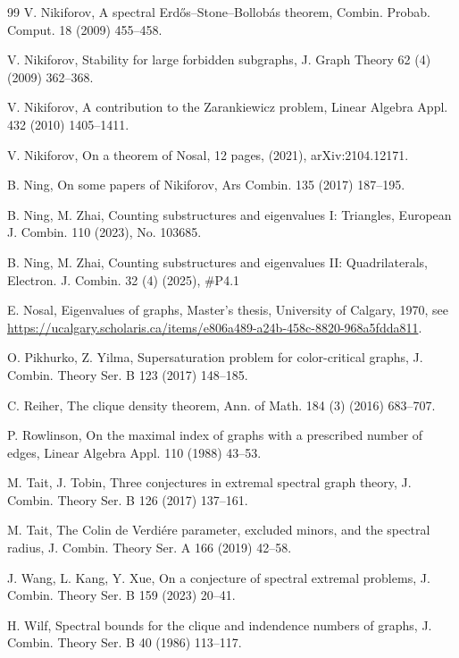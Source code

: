 \documentclass[11pt]{article}
\begin{document}
\begin{thebibliography}{99}
V. Nikiforov, 
A spectral Erd\H{o}s--Stone--Bollob\'{a}s theorem, 
Combin. Probab.  Comput. 18 (2009) 455--458.  

V. Nikiforov, 
Stability for large forbidden subgraphs,  
J. Graph Theory 62 (4) (2009) 362--368.  


V. Nikiforov, A contribution to the Zarankiewicz problem, 
Linear Algebra Appl. 432 (2010) 1405--1411. 

 V. Nikiforov,  On a theorem of Nosal, 12 pages, 
 (2021), arXiv:2104.12171. 

 B. Ning, On some papers of Nikiforov, 
 Ars Combin. 135 (2017) 187--195. 
 
B. Ning, M. Zhai, Counting substructures and eigenvalues I: Triangles, 
European J. Combin.  110 (2023), No. 103685. 

B. Ning, M. Zhai, Counting substructures and eigenvalues II: Quadrilaterals, 
Electron. J. Combin. 32 (4) (2025), \#P4.1 


E. Nosal, Eigenvalues of graphs, Master's thesis, University of Calgary, 1970,  
see \url{https://ucalgary.scholaris.ca/items/e806a489-a24b-458c-8820-968a5fdda811}. 


O. Pikhurko, Z. Yilma, 
Supersaturation problem for color-critical graphs, 
J. Combin. Theory Ser. B 123 (2017) 148--185.

 C. Reiher, The clique density theorem, 
 Ann. of Math. 184 (3) (2016) 683--707.
 
 P. Rowlinson, 
 On the maximal index of graphs with a prescribed number of edges, 
Linear Algebra Appl. 110 (1988) 43--53.  


M. Tait, J. Tobin,
Three conjectures in extremal spectral graph theory,
J. Combin. Theory Ser. B 126 (2017) 137--161.

M. Tait, 
The Colin de Verdi\'{e}re parameter, excluded minors, and the spectral radius, 
J. Combin. Theory Ser. A 166 (2019) 42--58.

J. Wang, L. Kang, Y. Xue, 
On a conjecture of spectral extremal problems, 
J. Combin. Theory Ser. B 159 (2023) 20--41.  

H. Wilf, 
Spectral bounds for the clique and indendence numbers of graphs, 
J. Combin. Theory Ser. B 40 (1986) 113--117.  


\end{thebibliography}
\end{document}
